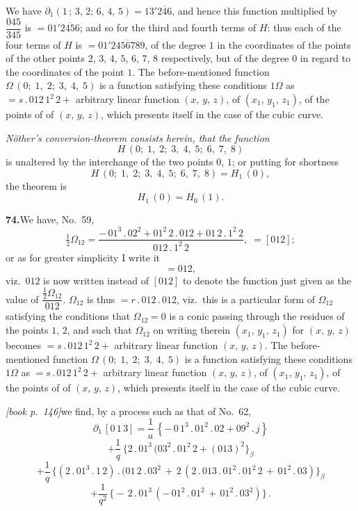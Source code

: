 \documentclass[11pt,a4paper]{article}
\theoremstyle{plain}
\theoremstyle{definition}
\theoremstyle{remark}
\providecommand{\bdet}[1]{\overline{#1}}
\begin{document}
We have $\partial_1(1\,;\,3,\,2;\,6,\,4,\,5) = 13'\bdet{246}$, and hence this function multiplied by $\dfrac{045}{345}$ is $= 01'\bdet{2456}$; and so for the third and fourth terms of $H$: thus each of the four terms of $H$ is $= 01'\bdet{2456789}$, of the degree $1$ in the coordinates of the points of the other points $2$, $3$, $4$, $5$, $6$, $7$, $8$ respectively, but of the degree $0$ in regard to the coordinates of the point $1$. The before-mentioned function $\Omega\,(0;\;1,\;2;\;3,\;4,\;5)$ is a function satisfying these conditions $1\Omega$ as $= s\,.\,012\,1^{2}\,2 +$ arbitrary linear function $(x,\,y,\,z)$, of $(x_1,\,y_1,\,z_1)$, of the points of of $(x,\,y,\,z)$, which presents itself in the case of the cubic curve.

\medskip\noindent\textit{Nöther's conversion-theorem consists herein, that the function}
\[
H\,(0;\;1,\;2;\;3,\;4,\;5;\;6,\;7,\;8)
\]
is unaltered by the interchange of the two points $0$, $1$; or putting for shortness
\[
H\,(0;\;1,\;2;\;3,\;4,\;5;\;6,\;7,\;8) = H_1\,(0),
\]
the theorem is
\[
H_1\,(0) = H_0\,(1).
\]

\medskip\noindent\textbf{74.}\quad We have, No.~59,
\[
\tfrac{1}{2}\Omega_{12} = \frac{-\,01^{3}\,.\,02^{2} + 01^{2}\,2\,.\,012 + 01\,2\,.\,1^{2}\,2}{012\,.\,1^{2}\,2},\;= [012];
\]
or as for greater simplicity I write it
\[
= 012,
\]
viz.\ $012$ is now written instead of $[012]$ to denote the function just given as the value of $\dfrac{\tfrac{1}{2}\Omega_{12}}{012}$. $\Omega_{12}$ is thus $= r\,.\,012\,.\,012$, viz.\ this is a particular form of $\Omega_{12}$ satisfying the conditions that $\Omega_{12} = 0$ is a conic passing through the residues of the points $1$, $2$, and such that $\Omega_{12}$ on writing therein $(x_1,\,y_1,\,z_1)$ for $(x,\,y,\,z)$ becomes $= s\,.\,012\,1^{2}\,2 +$ arbitrary linear function $(x,\,y,\,z)$. The before-mentioned function $\Omega\,(0;\;1,\;2;\;3,\;4,\;5)$ is a function satisfying these conditions $1\Omega$ as $= s\,.\,012\,1^{2}\,2 +$ arbitrary linear function $(x,\,y,\,z)$, of $(x_1,\,y_1,\,z_1)$, of the points of of $(x,\,y,\,z)$, which presents itself in the case of the cubic curve.

\medskip\noindent\textit{[book p.~146]}\quad we find, by a process such as that of No.\ 62,
\[
\partial_1\,[0\,1\,3] = \frac{1}{a}\,\left\{-\,0\,1^{3}\,.\,01^{2}\,.\,02 + 09^{2}\,.\,j\right\}
\]
\[
+ \frac{1}{q}\,\bigl\{2\,.\,01^{3}\,(03^{2}\,.\,01^{2}\,2 + (013)^{2}\bigr\}_{\beta}
\]
\[
+ \frac{1}{q}\,\bigl\{(2\,.\,01^{3}\,.\,1\,2)\,.\,(01\,2\,.\,03^{2}\,+\,2\,(2\,.\,013\,.\,01^{2}\,.\,01^{2}\,2\,+\,01^{2}\,.\,03)\bigr\}_{\beta}
\]
\[
+ \frac{1}{q^{2}}\,\bigl\{-\,2\,.\,01^{3}\,(-\,01^{2}\,.\,01^{2}\,+\,01^{2}\,.\,03^{2})\bigr\}\,.
\]
\end{document}
